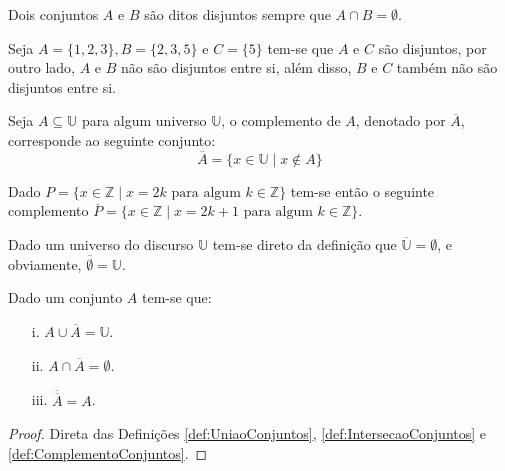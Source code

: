 \begin{definition}\label{def:ConjuntosDisjuntos}
	Dois conjuntos $A$ e $B$ são ditos disjuntos sempre que $A \cap B = \emptyset$.
\end{definition}

\begin{example}\label{exe:ConjuntosDisjuntos}
	Seja $A = \{1, 2, 3\}, B = \{2, 3, 5\}$ e $C = \{5\}$ tem-se que $A$ e $C$ são disjuntos, por outro lado, $A$ e $B$ não são disjuntos entre si, além disso, $B$ e $C$ também não são disjuntos entre si.
\end{example}

\begin{definition}\label{def:ComplementoConjuntos}
	Seja $A \subseteq \mathbb{U}$ para algum universo $\mathbb{U}$, o complemento de $A$, denotado por $\overline{A}$, corresponde ao seguinte conjunto:
	$$\overline{A} = \{x \in \mathbb{U} \mid x \notin A\}$$
\end{definition}

\begin{example}\label{exe:Complemento}
	Dado $P = \{ x \in \mathbb{Z} \mid x = 2k \mbox{ para algum } k \in \mathbb{Z}\}$ tem-se então o seguinte complemento $\overline{P} = \{ x \in \mathbb{Z} \mid x = 2k + 1 \mbox{ para algum } k \in \mathbb{Z}\}$.
\end{example}

\begin{example}
	Dado um universo do discurso $\mathbb{U}$ tem-se direto da definição que $\overline{\mathbb{U}} = \emptyset$, e obviamente, $\overline{\emptyset} = \mathbb{U}$.
\end{example}

\begin{theorem}\label{teo:PropriedadesComplemento}
	Dado um conjunto $A$ tem-se que:
	\begin{itemize}
		\item[i.] $A \cup \overline{A} = \mathbb{U}$.
		\item[ii.] $A \cap \overline{A} = \emptyset$.
		\item[iii.] $\overline{\overline{A}} = A$.
	\end{itemize}
\end{theorem}

\begin{proof}
	Direta das Definições \ref{def:UniaoConjuntos}, \ref{def:IntersecaoConjuntos} e \ref{def:ComplementoConjuntos}.
\end{proof}

